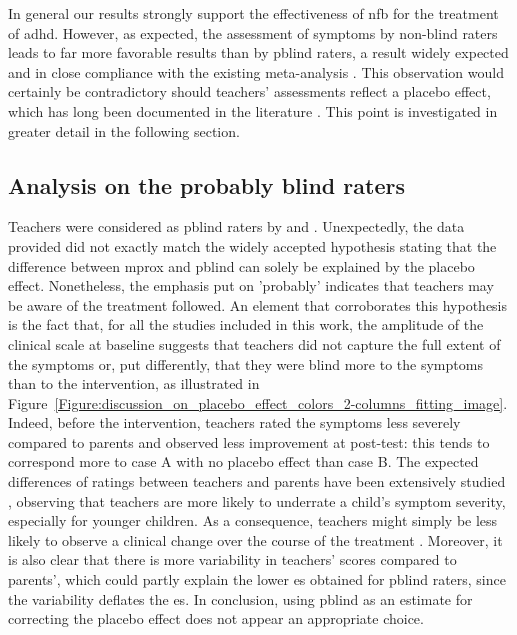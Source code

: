 In general our results strongly support the effectiveness of \gls{nfb} for the treatment of \gls{adhd}. However, as expected, the assessment of symptoms by non-blind raters 
leads to far more favorable results than by \gls{pblind} raters, a result widely expected and in close compliance with the existing 
meta-analysis \citep{Cortese2016, Micoulaud2014}. This observation would certainly be contradictory should teachers’ 
assessments reflect a placebo effect, which has long been documented in the literature \citep{Sollie2013, Narad2015, Minder2018}. 
This point is investigated in greater detail in the following section.

\subsection{Analysis on the probably blind raters}

Teachers were considered as \gls{pblind} raters by \citeauthor{Cortese2016} and \citeauthor{Micoulaud2014}.
Unexpectedly, the data provided did not exactly match the widely accepted hypothesis stating that the difference between
\gls{mprox} and \gls{pblind} can solely be explained by the placebo effect. 
Nonetheless, the emphasis put on 'probably' indicates that teachers may be aware of the treatment followed. 
An element that corroborates this hypothesis is the fact that, for all the studies included in this work, the amplitude 
of the clinical scale at baseline suggests that teachers did not capture the full extent of the symptoms or, put differently, 
that they were blind more to the symptoms than to the intervention, as illustrated 
in Figure~\ref{Figure:discussion_on_placebo_effect_colors_2-columns_fitting_image}. 
Indeed, before the intervention, teachers rated the symptoms less severely compared to parents and observed less improvement at post-test: 
this tends to correspond more to case A with no placebo effect than case B. The expected differences of ratings between 
teachers and parents have been extensively studied \citep{Sollie2013, Narad2015, Minder2018}, observing that teachers are more 
likely to underrate a child's symptom severity, especially for younger children. As a consequence, teachers might simply be less likely 
to observe a clinical change over the course of the treatment \citep{Sollie2013, Narad2015, Minder2018}. Moreover, it is also clear 
that there is more variability in teachers' scores compared to parents', which could partly explain the lower \gls{es} obtained for 
\gls{pblind} raters, since the variability deflates the \gls{es}. In conclusion, using \gls{pblind} as an estimate for correcting the 
placebo effect does not appear an appropriate choice. 

